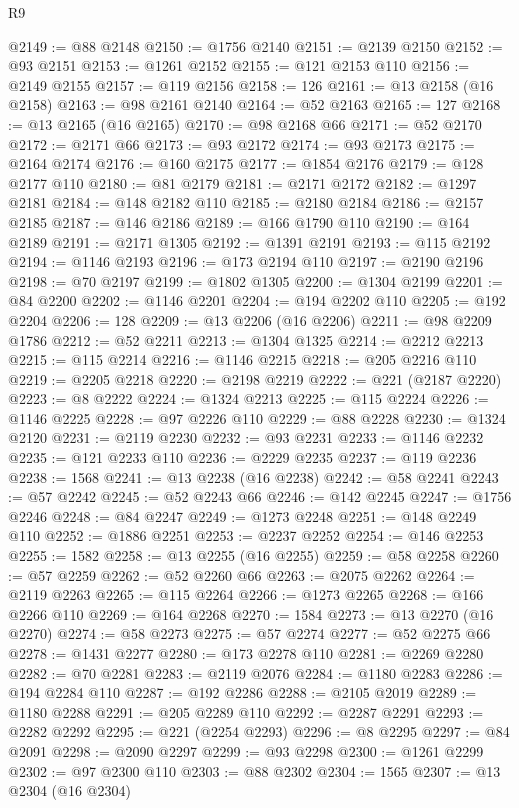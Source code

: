 \begin{lexlean}{R9}
\begin{coremodule}
@2149 := @88 @2148
@2150 := @1756 @2140
@2151 := @2139 @2150
@2152 := @93 @2151
@2153 := @1261 @2152
@2155 := @121 @2153 @110
@2156 := @2149 @2155
@2157 := @119 @2156
@2158 := 126
@2161 := @13 @2158 (@16 @2158)
@2163 := @98 @2161 @2140
@2164 := @52 @2163
@2165 := 127
@2168 := @13 @2165 (@16 @2165)
@2170 := @98 @2168 @66
@2171 := @52 @2170
@2172 := @2171 @66
@2173 := @93 @2172
@2174 := @93 @2173
@2175 := @2164 @2174
@2176 := @160 @2175
@2177 := @1854 @2176
@2179 := @128 @2177 @110
@2180 := @81 @2179
@2181 := @2171 @2172
@2182 := @1297 @2181
@2184 := @148 @2182 @110
@2185 := @2180 @2184
@2186 := @2157 @2185
@2187 := @146 @2186
@2189 := @166 @1790 @110
@2190 := @164 @2189
@2191 := @2171 @1305
@2192 := @1391 @2191
@2193 := @115 @2192
@2194 := @1146 @2193
@2196 := @173 @2194 @110
@2197 := @2190 @2196
@2198 := @70 @2197
@2199 := @1802 @1305
@2200 := @1304 @2199
@2201 := @84 @2200
@2202 := @1146 @2201
@2204 := @194 @2202 @110
@2205 := @192 @2204
@2206 := 128
@2209 := @13 @2206 (@16 @2206)
@2211 := @98 @2209 @1786
@2212 := @52 @2211
@2213 := @1304 @1325
@2214 := @2212 @2213
@2215 := @115 @2214
@2216 := @1146 @2215
@2218 := @205 @2216 @110
@2219 := @2205 @2218
@2220 := @2198 @2219
@2222 := @221 (@2187 @2220)
@2223 := @8 @2222
@2224 := @1324 @2213
@2225 := @115 @2224
@2226 := @1146 @2225
@2228 := @97 @2226 @110
@2229 := @88 @2228
@2230 := @1324 @2120
@2231 := @2119 @2230
@2232 := @93 @2231
@2233 := @1146 @2232
@2235 := @121 @2233 @110
@2236 := @2229 @2235
@2237 := @119 @2236
@2238 := 1568
@2241 := @13 @2238 (@16 @2238)
@2242 := @58 @2241
@2243 := @57 @2242
@2245 := @52 @2243 @66
@2246 := @142 @2245
@2247 := @1756 @2246
@2248 := @84 @2247
@2249 := @1273 @2248
@2251 := @148 @2249 @110
@2252 := @1886 @2251
@2253 := @2237 @2252
@2254 := @146 @2253
@2255 := 1582
@2258 := @13 @2255 (@16 @2255)
@2259 := @58 @2258
@2260 := @57 @2259
@2262 := @52 @2260 @66
@2263 := @2075 @2262
@2264 := @2119 @2263
@2265 := @115 @2264
@2266 := @1273 @2265
@2268 := @166 @2266 @110
@2269 := @164 @2268
@2270 := 1584
@2273 := @13 @2270 (@16 @2270)
@2274 := @58 @2273
@2275 := @57 @2274
@2277 := @52 @2275 @66
@2278 := @1431 @2277
@2280 := @173 @2278 @110
@2281 := @2269 @2280
@2282 := @70 @2281
@2283 := @2119 @2076
@2284 := @1180 @2283
@2286 := @194 @2284 @110
@2287 := @192 @2286
@2288 := @2105 @2019
@2289 := @1180 @2288
@2291 := @205 @2289 @110
@2292 := @2287 @2291
@2293 := @2282 @2292
@2295 := @221 (@2254 @2293)
@2296 := @8 @2295
@2297 := @84 @2091
@2298 := @2090 @2297
@2299 := @93 @2298
@2300 := @1261 @2299
@2302 := @97 @2300 @110
@2303 := @88 @2302
@2304 := 1565
@2307 := @13 @2304 (@16 @2304)

\end{coremodule}
\end{lexlean}
